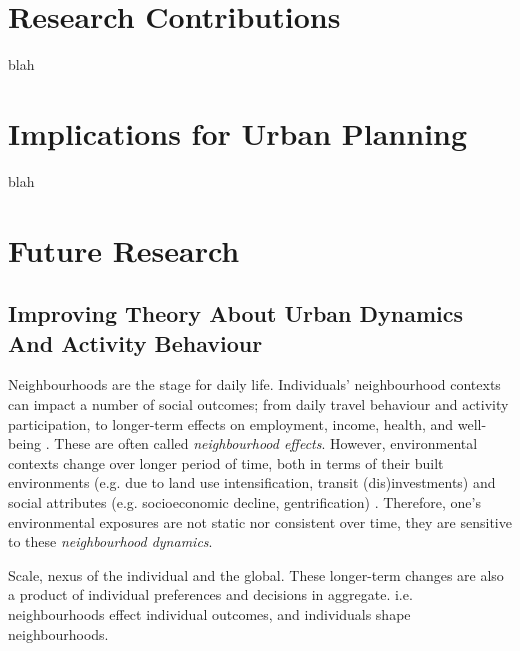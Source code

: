 
\section{Research Contributions}


blah


\section{Implications for Urban Planning}

blah


\section{Future Research}




\subsection{Improving Theory About Urban Dynamics And Activity Behaviour}


Neighbourhoods are the stage for daily life. Individuals' neighbourhood contexts can impact a number of social outcomes; from daily travel behaviour and activity participation, to longer-term effects on employment, income, health, and well-being \cite{sampson_assessing_2002,ewing_travel_2010,lucas_transport_2012,bastiaanssen_does_2020}. These are often called \textit{neighbourhood effects}. However, environmental contexts change over longer period of time, both in terms of their built environments (e.g. due to land use intensification, transit (dis)investments) and social attributes (e.g. socioeconomic decline, gentrification) \cite{van_ham_understanding_2013,wegener_land-use_2004}. Therefore, one's environmental exposures are not static nor consistent over time, they are sensitive to these \textit{neighbourhood dynamics}. 

Scale, nexus of the individual and the global. 
These longer-term changes are also a product of individual preferences and decisions in aggregate. i.e. neighbourhoods effect individual outcomes, and individuals shape neighbourhoods.


